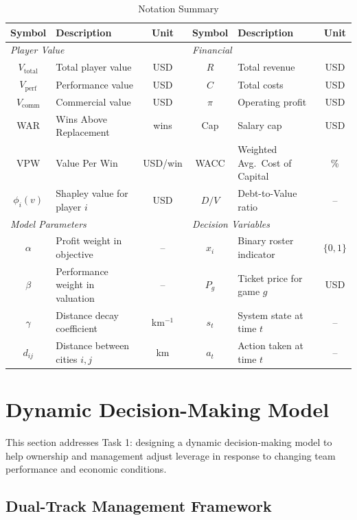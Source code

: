 \documentclass{mcmthesis}
\begin{document}
\begin{table}[H]
\centering
\caption{Notation Summary}
\small
\begin{tabular}{clc|clc}
\toprule
\textbf{Symbol} & \textbf{Description} & \textbf{Unit} & \textbf{Symbol} & \textbf{Description} & \textbf{Unit} \\
\midrule
\multicolumn{3}{l}{\textit{Player Value}} & \multicolumn{3}{l}{\textit{Financial}} \\
$V_{\text{total}}$ & Total player value & USD & $R$ & Total revenue & USD \\
$V_{\text{perf}}$ & Performance value & USD & $C$ & Total costs & USD \\
$V_{\text{comm}}$ & Commercial value & USD & $\pi$ & Operating profit & USD \\
WAR & Wins Above Replacement & wins & Cap & Salary cap & USD \\
VPW & Value Per Win & USD/win & WACC & Weighted Avg.\ Cost of Capital & \% \\
$\phi_i(v)$ & Shapley value for player $i$ & USD & $D/V$ & Debt-to-Value ratio & -- \\
\midrule
\multicolumn{3}{l}{\textit{Model Parameters}} & \multicolumn{3}{l}{\textit{Decision Variables}} \\
$\alpha$ & Profit weight in objective & -- & $x_i$ & Binary roster indicator & $\{0,1\}$ \\
$\beta$ & Performance weight in valuation & -- & $P_g$ & Ticket price for game $g$ & USD \\
$\gamma$ & Distance decay coefficient & km$^{-1}$ & $s_t$ & System state at time $t$ & -- \\
$d_{ij}$ & Distance between cities $i,j$ & km & $a_t$ & Action taken at time $t$ & -- \\
\bottomrule
\end{tabular}
\end{table}


\section{Dynamic Decision-Making Model}

This section addresses Task 1: designing a dynamic decision-making model to help ownership and management adjust leverage in response to changing team performance and economic conditions.

\subsection{Dual-Track Management Framework}
\end{document}
